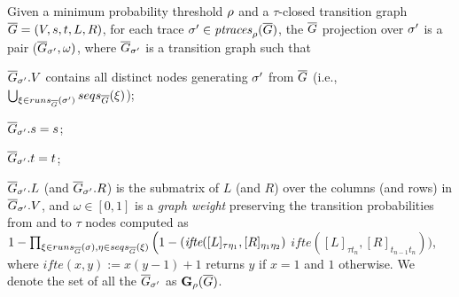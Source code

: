 	\begin{definition}
		Given a minimum probability thre\-shold $\pmin$ and a $\tau$-closed transition graph $\closed{G}=(V,s,t,L,R)$, for each trace $\nonlogtrace\in\ptraces{\closed{G}}{\pmin}$, the $\closed{G}$ projection over $\nonlogtrace$ is a pair ($\closed{G}_\nonlogtrace,\omega)$, where $\closed{G}_\nonlogtrace$ is a transition graph such that
\begin{inparaenum}[\it (i)]
	\item $\closed{G}_\nonlogtrace.V$ contains all distinct nodes generating $\nonlogtrace$ from $\closed{G}$	(i.e., $\bigcup_{\xi\in\runs{\nonlogtrace}{\closed{G}}}\seqs{\xi}{ \closed{G}}$);
	\item $\closed{G}_\nonlogtrace.s = s$;
	\item  $\closed{G}_\nonlogtrace.t = t$;
	\item $\closed{G}_\nonlogtrace.L$ (and $\closed{G}_\nonlogtrace.R$) is the submatrix of $L$ (and $R$) over the columns (and rows) in $\closed{G}_\nonlogtrace.V$, and $\omega \in [0,1]$ is a \emph{graph weight} preserving the transition probabilities from and to $\tau$ nodes computed as $1-\prod_{\xi\in\runs{\sigma}{\closed{G}},\eta\in\seqs{\xi}{\closed{G}}}\Big(1-(\textit{ifte}([L]_{\tau\eta_1},[R]_{\eta_1\eta_2})$
	 $\textit{ifte}([L]_{\tau t_n},[R]_{t_{n-1} t_n})\Big)$,
	where $\textit{ifte}(x,y):=x(y-1)+1$ returns $y$ if $x=1$ and $1$ otherwise. We denote the set of all the $\closed{G}_\nonlogtrace$ as $\TBf{\pmin}{4}(\closed{G})$.
\end{inparaenum}
%		
\end{definition}
